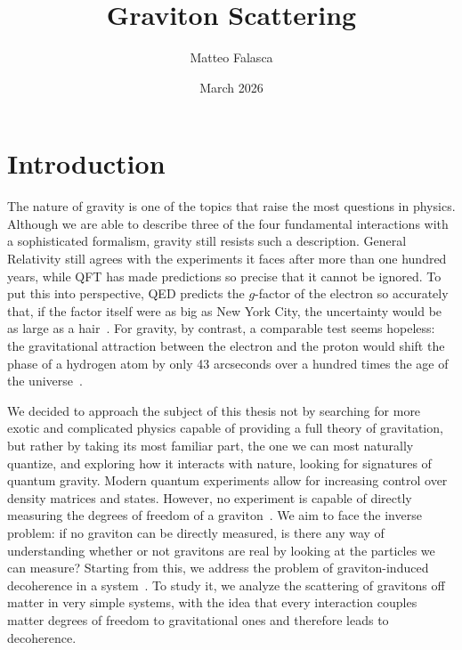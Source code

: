 \documentclass[12pt,a4paper,oneside]{article}
\title{Graviton Scattering}
\author{Matteo Falasca}
\date{March 2026}
\numberwithin{equation}{section}   %
\begin{document}
\maketitle




\section{Introduction}
The nature of gravity is one of the topics that raise the most questions
in physics. Although we are able to describe three of the four fundamental
interactions with a sophisticated formalism, gravity still resists such a
description. General Relativity still agrees with the experiments it faces
after more than one hundred years, while QFT has made predictions so precise
that it cannot be ignored. To put this into perspective, QED predicts the
$g$-factor of the electron so accurately that, if the factor itself were as
big as New York City, the uncertainty would be as large as a
hair~\cite{GreinerQED}. For gravity, by contrast, a comparable test seems hopeless:
the gravitational attraction between the electron and the proton would shift
the phase of a hydrogen atom by only 43 arcseconds over a hundred times the
age of the universe~\cite{Feynman1963}.

We decided to approach the subject of this thesis not by searching for more
exotic and complicated physics capable of providing a full theory of
gravitation, but rather by taking its most familiar part, the one we can most
naturally quantize, and exploring how it interacts with nature, looking for
signatures of quantum gravity.
Modern quantum experiments allow for increasing control over density matrices
and states. However, no experiment is capable of directly measuring the
degrees of freedom of a graviton~\cite{...}. We aim to face the inverse
problem: if no graviton can be directly measured, is there any way of
understanding whether or not gravitons are real by looking at the particles
we can measure?
Starting from this, we address the problem of graviton-induced decoherence
in a system~\cite{Blencowe2013}. To study it, we analyze the scattering of gravitons off matter
in very simple systems, with the idea that every interaction couples matter
degrees of freedom to gravitational ones and therefore leads to decoherence.
\end{document}
